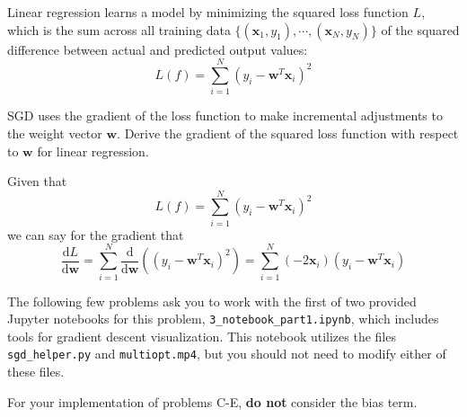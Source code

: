 \documentclass{article}
\begin{document}
Linear regression learns a model by minimizing the squared loss function $L$, which is the sum across all training data $\{(\mathbf{x}_1, y_1),\cdots,(\mathbf{x}_N, y_N)\}$ of the squared difference between actual and predicted output values:
\[L(f) = \sum_{i=1}^N (y_i - \mathbf{w}^T\mathbf{x}_i)^2\]

\begin{problem}[2]
  SGD uses the gradient of the loss function to make incremental adjustments to the weight vector $\mathbf{w}$. Derive the gradient of the squared loss function with respect to $\mathbf{w}$ for linear regression.
\end{problem}
\begin{solution}
  Given that 
  \begin{equation*}
      L(f) = \sum_{i=1}^N (y_i - \mathbf{w}^T\mathbf{x}_i)^2
  \end{equation*}
  we can say for the gradient that
  \begin{equation*}
      \frac{\text{d}L}{\text{d}\mathbf{w}} = \sum_{i=1}^{N}\frac{\text{d}}{\text{d}\mathbf{w}} \left((y_i - \mathbf{w}^T\mathbf{x}_i)^2\right) = \sum_{i=1}^{N}(-2\mathbf{x}_{i})(y_{i}-\mathbf{w}^{T}\mathbf{x}_{i})
  \end{equation*}
\end{solution}
\newpage
The following few problems ask you to work with the first of two provided Jupyter notebooks for this problem, \texttt{3_notebook_part1.ipynb}, which includes tools for gradient descent visualization. This notebook utilizes the files \texttt{sgd_helper.py} and \texttt{multiopt.mp4}, but you should not need to modify either of these files. 

For your implementation of problems C-E, \textbf{do not} consider the bias term.
\end{document}
